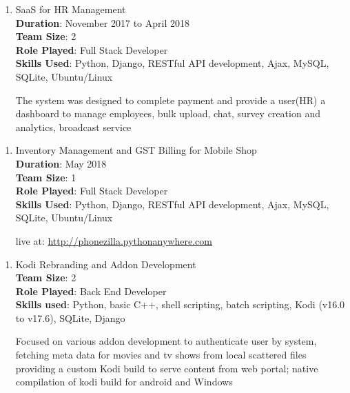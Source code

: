 \documentclass[a4paper, 14pt]{article}
\begin{document}
	\begin{enumerate}[start=1,label={\bfseries $\Rightarrow$ TITLE - }]
		\addtolength{\itemindent}{40pt}
		\item SaaS for HR Management
		\\ \textbf{Duration}: November 2017 to April 2018
		\\ \textbf{Team Size}: 2
		\\ \textbf{Role Played}: Full Stack Developer
		\\ \textbf{Skills Used}: Python, Django, RESTful API development, Ajax, MySQL, SQLite, Ubuntu/Linux
		
		The system was designed to complete payment and provide a user(HR) a dashboard to manage employees, bulk upload, chat, survey creation and analytics, broadcast service
	\end{enumerate}
	
	
	\begin{enumerate}[start=1,label={\bfseries $\Rightarrow$ TITLE - }]
		\addtolength{\itemindent}{40pt}
		\item Inventory Management and GST Billing for Mobile Shop
		\\ \textbf{Duration}: May 2018
		\\ \textbf{Team Size}: 1
		\\ \textbf{Role Played}: Full Stack Developer
		\\ \textbf{Skills Used}: Python, Django, RESTful API development, Ajax, MySQL, SQLite, Ubuntu/Linux
		
		live at: \url{http://phonezilla.pythonanywhere.com}
	\end{enumerate}
	
	\begin{enumerate}[start=1,label={\bfseries $\Rightarrow$ TITLE - }]
		\addtolength{\itemindent}{40pt}
		\item Kodi Rebranding and Addon Development
		\\ \textbf{Team Size}: 2
		\\ \textbf{Role Played}: Back End Developer
		\\ \textbf{Skills used}: Python, basic C++, shell scripting, batch scripting, Kodi (v16.0 to v17.6), SQLite, Django
		
		Focused on various addon development to authenticate user by system, fetching meta data for movies and tv shows from local scattered files providing a custom Kodi build to serve content from web portal; native compilation of kodi build for android and Windows
	\end{enumerate}
	
\end{document}
